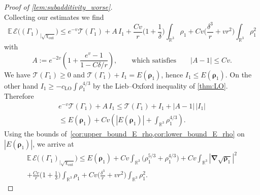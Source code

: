 \documentclass[final,reqno]{amsart}
\theoremstyle{remark}
\renewcommand{\le}{\leqslant}
\renewcommand{\ge}{\geqslant}
\newcommand{\RR}{\mathbb{R}}
\newcommand{\EE}{\mathbb{E}}
\newcommand{\LO}{\mathrm{LO}}
\newcommand{\grad}{\bm{\nabla}}
\newcommand{\TC}{\mathcal{T}}
\newcommand{\EC}{\mathcal{E}}
\begin{document}
\begin{proof}[Proof of \cref{lem:subadditivity_worse}]
$$$$
Collecting our estimates we find
\begin{equation*}
\EE\,\EC\big((\Gamma_1)_{|\sqrt{\chi_{\mathrm{out}}}}\big)\le e^{-v}\TC(\Gamma_1)+A\,I_1+\frac{Cv}{r}\Big(1+\frac1\delta\Big)\int_{\RR^3}\rho_1+Cv\Big(\frac{\delta^3}{r}+vr^2\Big)\int_{\RR^3}\rho_1^2
\end{equation*}
with
$$
A:=e^{-2v}\left(1+\frac{e^v-1}{1-C\delta/r}\right),\qquad\text{which satisfies}\qquad|A-1|\le Cv.
$$
We have $\TC(\Gamma_1)\ge0$ and $\TC(\Gamma_1)+I_1=E(\bm{\rho}_1)$, hence $I_1\le E(\bm{\rho}_1)$. On the other hand $I_1\ge-c_\LO\int\rho_1^{4/3}$ by the Lieb--Oxford inequality of \cref{thm:LO}. Therefore
\begin{multline*}
e^{-v}\TC(\Gamma_1)+A\,I_1\le \TC(\Gamma_1)+I_1+|A-1|\,|I_1|\\
\le E(\bm{\rho}_1)+Cv\left(|E(\bm{\rho}_1)|+\int_{\RR^3}\rho_1^{4/3}\right).
\end{multline*}
Using the bounds of~\cref{cor:upper_bound_E_rho,cor:lower_bound_E_rho} on $|E(\bm{\rho}_1)|$, we arrive at
\begin{multline}\label{eq:outside}
\EE\,\EC\big((\Gamma_1)_{|\sqrt{\chi_{\mathrm{out}}}}\big)\le E(\bm{\rho}_1)+Cv\int_{\RR^3}\big(\rho_1^{5/3}+\rho_1^{4/3}\big)+Cv\int_{\RR^3}|\grad\sqrt{\bm{\rho}_1}|^2\\
+\frac{Cv}{r}\Big(1+\frac1\delta\Big)\int_{\RR^3}\rho_1+Cv\Big(\frac{\delta^3}{r}+vr^2\Big)\int_{\RR^3}\rho_1^2.
\end{multline}

\medskip


\end{proof}
\end{document}
